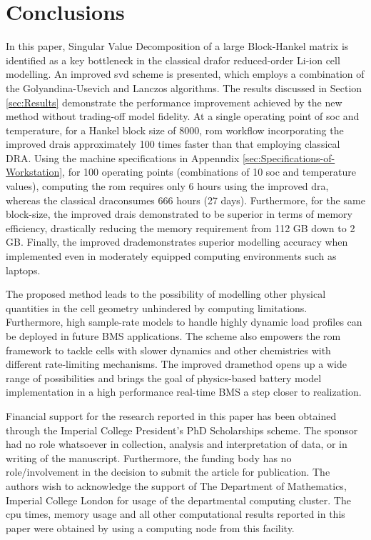 \begin{figure}
	\caption{}
	\label{time_domain_sim}
\end{figure}

\section{Conclusions\label{sec:Conclusion}}
In this paper, Singular Value Decomposition of a large Block-Hankel
matrix is identified as a key bottleneck in the classical \gls{dra}for
reduced-order Li-ion cell modelling. An improved \gls{svd} scheme is presented,
which employs a combination of the Golyandina-Usevich and Lanczos
algorithms. The results discussed in Section \ref{sec:Results} demonstrate
the performance improvement achieved by the new method without trading-off
model fidelity. At a single operating point of \gls{soc} and temperature,
for a Hankel block size of 8000, \gls{rom} workflow incorporating the improved
\gls{dra}is approximately 100 times faster than that employing classical
DRA. Using the machine specifications in Appenndix  \ref{sec:Specifications-of-Workstation},
for 100 operating points (combinations of 10 \gls{soc} and temperature values),
computing the \gls{rom} requires only 6 hours using the improved \gls{dra}, whereas
the classical \gls{dra}consumes 666 hours (27 days). Furthermore, for the
same block-size, the improved \gls{dra}is demonstrated to be superior in
terms of memory efficiency, drastically reducing the memory requirement
from 112 GB down to 2 GB. Finally, the improved \gls{dra}demonstrates superior
modelling accuracy when implemented even in moderately equipped computing
environments such as laptops.

The proposed method leads to the possibility of modelling other physical
quantities in the cell geometry unhindered by computing limitations.
Furthermore, high sample-rate models to handle highly dynamic load
profiles can be deployed in future BMS applications. The scheme also
empowers the \gls{rom} framework to tackle cells with slower dynamics and
other chemistries with different rate-limiting mechanisms. The improved
\gls{dra}method opens up a wide range of possibilities and brings the goal
of physics-based battery model implementation in a high performance
real-time BMS a step closer to realization.

\begin{acknowledgment}
Financial support for the research reported in this paper has been
obtained through the Imperial College President's PhD Scholarships
scheme. The sponsor had no role whatsoever in collection, analysis
and interpretation of data, or in writing of the manuscript. Furthermore,
the funding body has no role/involvement in the decision to submit
the article for publication. The authors wish to acknowledge the support
of The Department of Mathematics, Imperial College London for usage
of the departmental computing cluster. The \gls{cpu} times, memory usage
and all other computational results reported in this paper were obtained
by using a computing node from this facility.
\end{acknowledgment}

